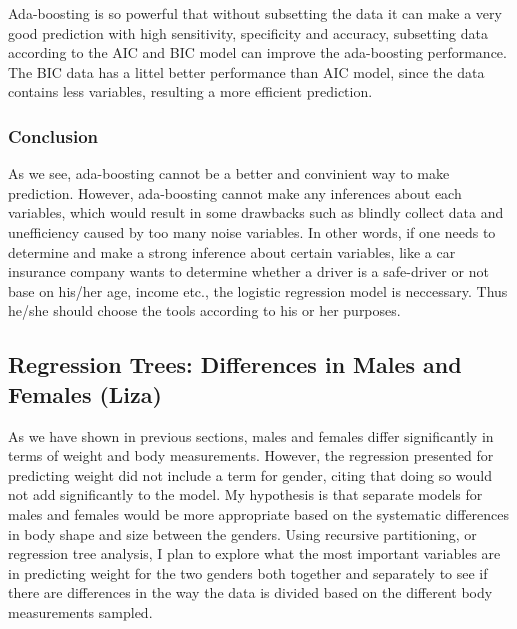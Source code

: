 \documentclass[11pt]{article}\usepackage[]{graphicx}\usepackage[]{color}
\begin{document}
Ada-boosting is so powerful that without subsetting the data it can make a very good prediction with high sensitivity, specificity and accuracy, subsetting data according to the AIC and BIC model can improve the ada-boosting performance. The BIC data has a littel better performance than AIC model, since the data contains less variables, resulting a more efficient prediction.

\subsubsection{Conclusion}

As we see, ada-boosting cannot be a better and convinient way to make prediction. However, ada-boosting cannot make any inferences about each variables, which would result in some drawbacks such as blindly collect data and unefficiency caused by too many noise variables. In other words, if one needs to determine and make a strong inference about certain variables, like a car insurance company wants to determine whether a driver is a safe-driver or not base on his/her age, income etc., the logistic regression model is neccessary. Thus he/she should choose the tools according to his or her purposes.

\newpage

\subsection{Regression Trees: Differences in Males and Females (Liza)} %

As we have shown in previous sections, males and females differ significantly in terms of weight and body measurements. However, the regression presented for predicting weight did not include a term for gender, citing that doing so would not add significantly to the model. My hypothesis is that separate models for males and females would be more appropriate based on the systematic differences in body shape and size between the genders. Using recursive partitioning, or regression tree analysis, I plan to explore what the most important variables are in predicting weight for the two genders both together and separately to see if there are differences in the way the data is divided based on the different body measurements sampled.
\end{document}
